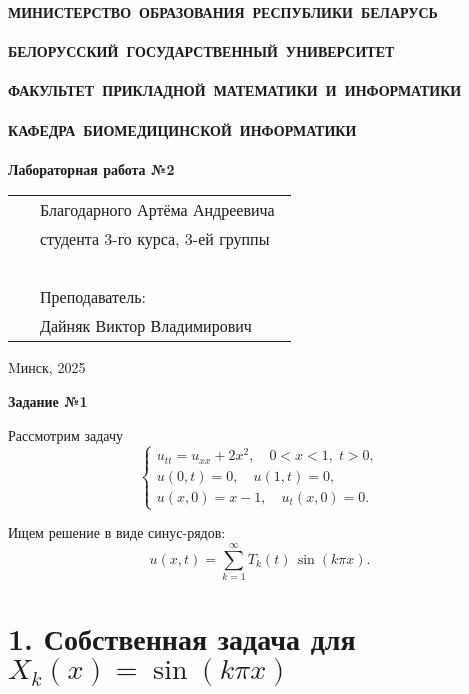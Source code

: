 \documentclass[a4paper,12pt]{article}
\begin{document}
\setcounter{page}{1}
\thispagestyle{empty}
\begin{center}
\bf
\vspace{4cm}
{
\mbox{МИНИСТЕРСТВО~ОБРАЗОВАНИЯ~РЕСПУБЛИКИ~БЕЛАРУСЬ} \\~\\
\mbox{БЕЛОРУССКИЙ~ГОСУДАРСТВЕННЫЙ~УНИВЕРСИТЕТ} \\~\\
\mbox{ФАКУЛЬТЕТ~ПРИКЛАДНОЙ~МАТЕМАТИКИ~И~ИНФОРМАТИКИ} \\~\\
\mbox{КАФЕДРА~БИОМЕДИЦИНСКОЙ~ИНФОРМАТИКИ} \\~\\
}
\vspace{4cm}
\bf
\rm Лабораторная работа №2
\vspace{6cm}
\end{center}
\begin{tabular}{ll}
\hspace{10.5cm}
&Благодарного Артёма Андреевича~\\
&студента 3-го курса, 3-ей группы\\~\\
&Преподаватель:\\
&Дайняк Виктор Владимирович
\end{tabular}
\vspace{7cm}
\begin{center}
Mинск, 2025
\end{center}
\clearpage
\restoregeometry

\begin{center}    
\noindent \textbf{Задание №1}
\end{center}

Рассмотрим задачу
\[
\begin{cases}
u_{tt}=u_{xx}+2x^2,\quad 0<x<1,\;t>0,\\
u(0,t)=0,\quad u(1,t)=0,\\
u(x,0)=x-1,\quad u_t(x,0)=0.
\end{cases}
\]

Ищем решение в виде синус-рядов:
\[
u(x,t)=\sum_{k=1}^\infty T_k(t)\,\sin(k\pi x).
\]

\section*{1. Собственная задача для $X_k(x)=\sin(k\pi x)$}
\end{document}
